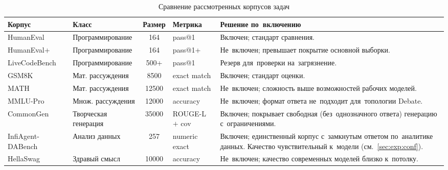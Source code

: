 \begin{table}[!htbp]
\caption{Сравнение рассмотренных корпусов задач}
\label{tab:meth:corpora}
\footnotesize
\renewcommand{\arraystretch}{1.25}
\begin{tabularx}{\textwidth}{%
   >{\raggedright\arraybackslash}p{2.6cm}%
   >{\raggedright\arraybackslash}p{2.4cm}%
   c%
   >{\raggedright\arraybackslash}p{1.7cm}%
   >{\raggedright\arraybackslash}X}
\toprule
\textbf{Корпус} & \textbf{Класс} & \textbf{Размер} &
\textbf{Метрика} & \textbf{Решение по~включению} \\
\midrule
HumanEval~\cite{humaneval2021}        & Программирование    & 164   & pass@1        & Включен; стандарт сравнения. \\
HumanEval+~\cite{humanevalplus2023}   & Программирование    & 164   & pass@1+       & Не~включен; превышает покрытие основной выборки. \\
LiveCodeBench~\cite{livecodebench2024} & Программирование   & 500+  & pass@1        & Резерв для~проверки на~загрязнение. \\
GSM8K~\cite{gsm8k2021}                & Мат. рассуждения    & 8500  & exact match   & Включен; стандарт оценки. \\
MATH~\cite{mathbench2021}             & Мат. рассуждения    & 12500 & exact match   & Не~включен; сложность выше возможностей рабочих моделей. \\
MMLU-Pro~\cite{mmlupro2024}           & Множ. рассуждения   & 12000 & accuracy      & Не~включен; формат ответа не~подходит для~топологии Debate. \\
CommonGen~\cite{commongen2020}        & Творческая генерация & 35000 & ROUGE-L $+$ cov & Включен; покрывает свободная (без~однозначного ответа) генерацию с~ограничениями. \\
InfiAgent-DABench~\cite{dabench2024}  & Анализ данных       & 257   & numeric exact & Включен; единственный корпус с~замкнутым ответом по~аналитике данных. Качество чувствительный к~модели (см.~\ref{sec:exp:conf}). \\
HellaSwag~\cite{hellaswag2019}        & Здравый смысл       & 10000 & accuracy      & Не~включен; качество современных моделей близко к~потолку. \\
\bottomrule
\end{tabularx}
\end{table}

